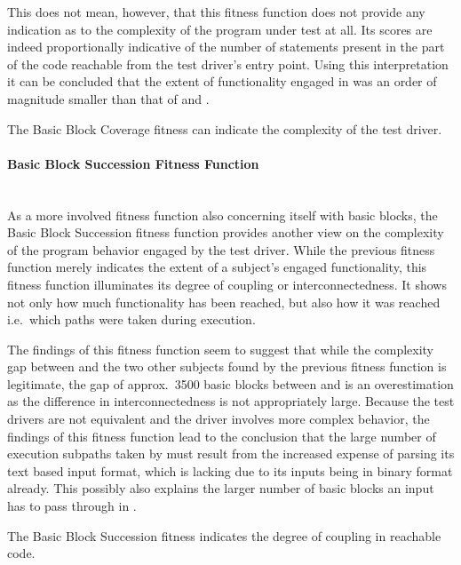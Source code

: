 This does not mean, however, that this fitness function does not provide any indication as to the complexity of
the program under test at all. Its scores are indeed proportionally indicative of the number of statements
present in the part of the code reachable from the test driver's entry point. Using this interpretation it can
be concluded that the extent of functionality engaged in \libpcap was an order of magnitude smaller than that
of \libpng and \libxml.

\begin{mdframed}
\centering
The Basic Block Coverage fitness can indicate the complexity of the test driver. 
\end{mdframed}

\paragraph{Basic Block Succession Fitness Function} ~\\
As a more involved fitness function also concerning itself with basic blocks, the Basic Block Succession
fitness function provides another view on the complexity of the program behavior engaged by the test driver.
While the previous fitness function merely indicates the extent of a subject's engaged functionality, this
fitness function illuminates its degree of coupling or interconnectedness. It shows not only how much
functionality has been reached, but also how it was reached i.e.\ which paths were taken during execution.

The findings of this fitness function seem to suggest that while the complexity gap between \libpcap and the
two other subjects found by the previous fitness function is legitimate, the gap of approx.\ 3500 basic blocks
between \libpng and \libxml is an overestimation as the difference in interconnectedness is not appropriately
large. Because the test drivers are not equivalent and the \libpng driver involves more complex
behavior, the findings of this fitness function lead to the conclusion that the large number of execution
subpaths taken by \libxml must result from the increased expense of parsing its text based input format, which
\libpng is lacking due to its inputs being in binary format already. This possibly also explains the larger
number of basic blocks an input has to pass through in \libxml.

\begin{mdframed}
\centering
The Basic Block Succession fitness indicates the degree of coupling in reachable code.
\end{mdframed}

